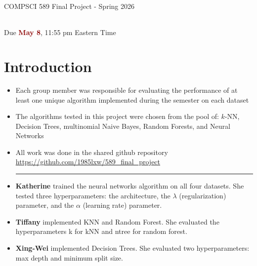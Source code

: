 \documentclass{article}
\begin{document}
\newpage
\vspace*{1cm}
\begin{center}
    \begin{Large}
    COMPSCI 589 Final Project - Spring 2026
    \end{Large}
    \\
    \vspace{0.15cm}
    Due \textcolor{darkred}{\textbf{May 8}}, 11:55 pm Eastern Time
\end{center}







\vspace{0.5cm}
\section*{Introduction}
\vspace{0.5cm}

\begin{itemize}
    \item Each group member was responsible for evaluating the performance of at least one unique algorithm implemented during the semester on each dataset 
    \item The algorithms tested in this project were chosen from the pool of: $k$-NN, Decision Trees, multinomial Naive Bayes, Random Forests, and Neural Networks
    \item All work was done in the shared github repository \url{https://github.com/1985lxw/589_final_project}
    
    \vspace{0.3cm}
    \noindent\rule{\linewidth}{0.5pt}
    \vspace{0.025cm}
    \item \textbf{Katherine} trained the neural networks algorithm on all four datasets. 
    She tested three hyperparameters: 
    the architecture, 
    the $\lambda$ (regularization) parameter, 
    and the $\alpha$ (learning rate) parameter. 
    \item \textbf{Tiffany} implemented KNN and Random Forest. She evaluated the hyperparameters k for kNN and ntree for random forest.
    \item \textbf{Xing-Wei} implemented Decision Trees. She evaluated two hyperparameters: max depth and minimum split size.
\end{itemize}
\end{document}
